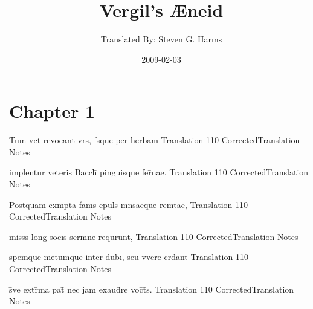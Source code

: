 \documentclass[]{book}
\title{Vergil's {\AE}neid}
\author{ Translated By:  Steven G. Harms }
\date{2009-02-03}
\begin{document}

\ifpdf
{}
\else
{}
\fi

\enumstyle 

\maketitle
\tableofcontents

\chapter{Chapter 1}
%
%
%
%
%
% 
% 
% 

\latline
  {Tum v\={\macron {\i}}ct\={} revocant v\={\macron {\i}}r\={\macron {\i}}s, f\={}s\={\macron {\i}}que per herbam}
  { Translation }
  {110}
  { CorrectedTranslation }
  { Notes }


\latline
  {implentur veteris Bacch\={\macron {\i}} pinguisque fer\={\macron {\i}}nae.}
  { Translation }
  {110}
  { CorrectedTranslation }
  { Notes }


\latline
  {Postquam ex\={}mpta fam\={}s epul\={\macron {\i}}s m\={}nsaeque rem\={}tae,}
  { Translation }
  {110}
  { CorrectedTranslation }
  { Notes }


\latline
  {\={}miss\={}s long\={} soci\={}s serm\={}ne requ\={\macron {\i}}runt,}
  { Translation }
  {110}
  { CorrectedTranslation }
  { Notes }


\latline
  {spemque metumque inter dubi\={\macron {\i}}, seu v\={\macron {\i}}vere cr\={}dant}
  { Translation }
  {110}
  { CorrectedTranslation }
  { Notes }


\latline
  {s\={\macron {\i}}ve extr\={}ma pat\={\macron {\i}} nec jam exaud\={\macron {\i}}re voc\={}t\={}s.}
  { Translation }
  {110}
  { CorrectedTranslation }
  { Notes }




\end{document}
